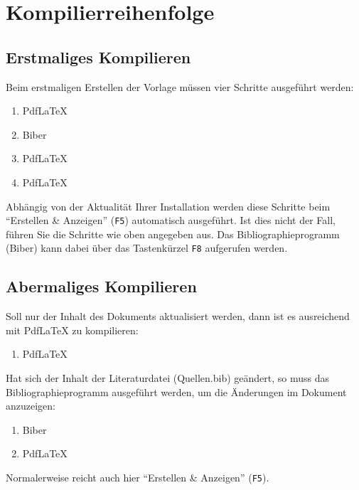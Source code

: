 \documentclass[final, english, ngerman, a4paper, 10pt, %
numbers=noenddot,
cd=true,
cdfont=false,cdfont=nohead,cdfont=nodin,
cdmath=false,
cdhead=false,
cdfoot=true,
cdcover=monochrome,
cdgeometry=symmetric,
declaration=heading,
declaration=notoc,
abstract=heading,
]{tudscrartcl}
\newcommand{\pfad}[1]{{\ttfamily\glqq #1\grqq}}
\begin{document}
\section{Kompilierreihenfolge}

\subsection*{Erstmaliges Kompilieren}

Beim erstmaligen Erstellen der Vorlage müssen vier Schritte ausgeführt werden:\footnotemark
\begin{enumerate}
	\item PdfLaTeX
	\item Biber
	\item PdfLaTeX
	\item PdfLaTeX
\end{enumerate}
Abhängig von der Aktualität Ihrer Installation werden diese Schritte beim \enquote{Erstellen \& Anzeigen} (\texttt{F5}) automatisch ausgeführt. Ist dies nicht der Fall, führen Sie die Schritte wie oben angegeben aus. Das Bibliographieprogramm (Biber) kann dabei über das Tastenkürzel \texttt{F8} aufgerufen werden.

\subsection*{Abermaliges Kompilieren}

Soll nur der Inhalt des Dokuments aktualisiert werden, dann ist es ausreichend mit PdfLaTeX zu kompilieren:
\begin{enumerate}
	\item PdfLaTeX
\end{enumerate}
Hat sich der Inhalt der Literaturdatei (\pfad{Quellen.bib}) geändert, so muss das Bibliographieprogramm ausgeführt werden, um die Änderungen im Dokument anzuzeigen:\footnotemark
\begin{enumerate}
	\item Biber
	\item PdfLaTeX
\end{enumerate}
Normalerweise reicht auch hier \enquote{Erstellen \& Anzeigen} (\texttt{F5}).
\end{document}
